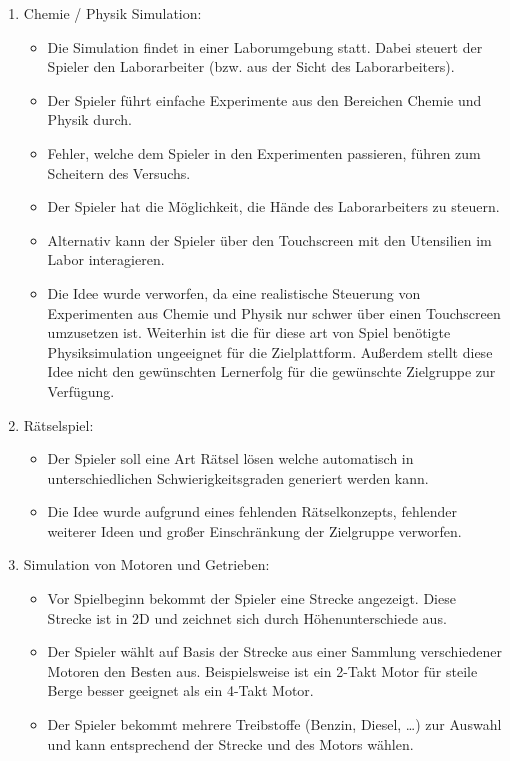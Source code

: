 	\begin{enumerate}
		\item{Chemie / Physik Simulation:}
		\begin{itemize}
			\item{Die Simulation findet in einer Laborumgebung statt. Dabei steuert der Spieler den Laborarbeiter (bzw. aus der Sicht des Laborarbeiters).}
			\item{Der Spieler führt einfache Experimente aus den Bereichen Chemie und Physik durch.}
			\item{Fehler, welche dem Spieler in den Experimenten passieren, führen zum Scheitern des Versuchs.}
			\item{Der Spieler hat die Möglichkeit, die Hände des Laborarbeiters zu steuern.}
			\item{Alternativ kann der Spieler über den Touchscreen mit den Utensilien im Labor interagieren.}
			\item{Die Idee wurde verworfen, da eine realistische Steuerung von Experimenten aus Chemie und Physik nur schwer über einen Touchscreen umzusetzen ist. Weiterhin ist die für diese art von Spiel benötigte Physiksimulation ungeeignet für die Zielplattform. Außerdem stellt diese Idee nicht den gewünschten Lernerfolg für die gewünschte Zielgruppe zur Verfügung. }
		\end{itemize}
		\item{Rätselspiel:}
		\begin{itemize}
			\item{Der Spieler soll eine Art Rätsel lösen welche automatisch in unterschiedlichen Schwierigkeitsgraden generiert werden kann.}
			\item{Die Idee wurde aufgrund eines fehlenden Rätselkonzepts, fehlender weiterer Ideen und großer Einschränkung der Zielgruppe verworfen.}
		\end{itemize}
		\item{Simulation von Motoren und Getrieben:}
		\begin{itemize}
			\item{Vor Spielbeginn bekommt der Spieler eine Strecke angezeigt. Diese Strecke ist in 2D und zeichnet sich durch Höhenunterschiede aus.}
			\item{Der Spieler wählt auf Basis der Strecke aus einer Sammlung verschiedener Motoren den Besten aus. Beispielsweise ist ein 2-Takt Motor für steile Berge besser geeignet als ein 4-Takt Motor.}
			\item{Der Spieler bekommt mehrere Treibstoffe (Benzin, Diesel, \dots) zur Auswahl und kann entsprechend der Strecke und des Motors wählen.}

\end{itemize}
\end{enumerate}
